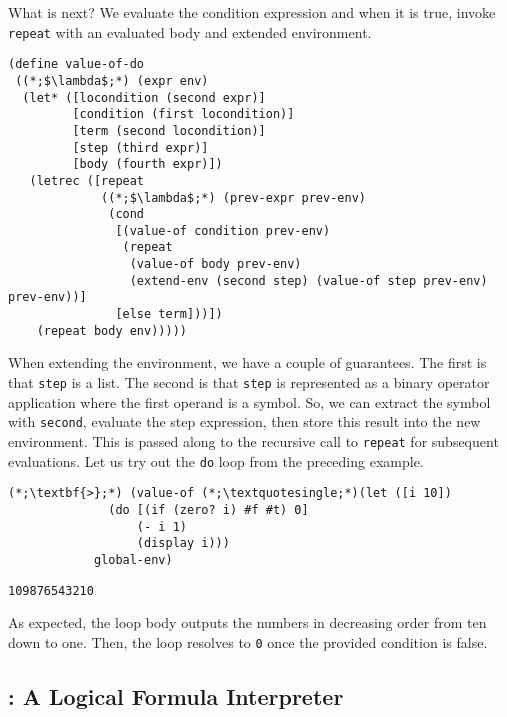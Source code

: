 What is next? We evaluate the condition expression and when it is true, invoke \texttt{repeat} with an evaluated body and extended environment.

\begin{cl}[]{}\begin{lstlisting}[language=MyScheme]
(define value-of-do
 ((*;$\lambda$;*) (expr env)
  (let* ([locondition (second expr)]
         [condition (first locondition)]
         [term (second locondition)]
         [step (third expr)]
         [body (fourth expr)])
   (letrec ([repeat 
             ((*;$\lambda$;*) (prev-expr prev-env)
              (cond
               [(value-of condition prev-env)
                (repeat 
                 (value-of body prev-env)
                 (extend-env (second step) (value-of step prev-env) prev-env))]
               [else term]))])
    (repeat body env)))))
\end{lstlisting}\end{cl}

When extending the environment, we have a couple of guarantees. The first is that \texttt{step} is a list. The second is that \texttt{step} is represented as a binary operator application where the first operand is a symbol. So, we can extract the symbol with \texttt{second}, evaluate the step expression, then store this result into the new environment. This is passed along to the recursive call to \texttt{repeat} for subsequent evaluations. Let us try out the \texttt{do} loop from the preceding example.

\begin{clo}[]{}
\begin{lstlisting}[language=MyNLNSOutput]
(*;\textbf{>};*) (value-of (*;\textquotesingle;*)(let ([i 10])
              (do [(if (zero? i) #f #t) 0]
                  (- i 1)
                  (display i))) 
            global-env)
\end{lstlisting}
\tcblower
\begin{lstlisting}[language=MyOutput]
109876543210
\end{lstlisting}
\end{clo}

As expected, the loop body outputs the numbers in decreasing order from ten down to one. Then, the loop resolves to \texttt{0} once the provided condition is false.

\clearpage
\subsection*{: A Logical Formula Interpreter}

